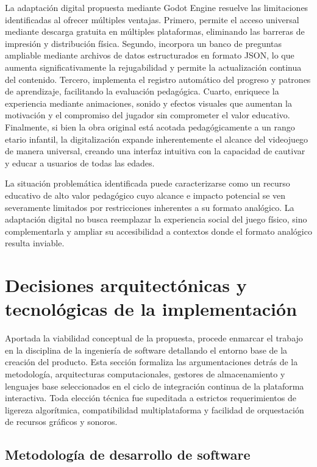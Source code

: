 La adaptación digital propuesta mediante Godot Engine resuelve las limitaciones identificadas al ofrecer múltiples ventajas. Primero, permite el acceso universal mediante descarga gratuita en múltiples plataformas, eliminando las barreras de impresión y distribución física. Segundo, incorpora un banco de preguntas ampliable mediante archivos de datos estructurados en formato JSON, lo que aumenta significativamente la rejugabilidad y permite la actualización continua del contenido. Tercero, implementa el registro automático del progreso y patrones de aprendizaje, facilitando la evaluación pedagógica. Cuarto, enriquece la experiencia mediante animaciones, sonido y efectos visuales que aumentan la motivación y el compromiso del jugador sin comprometer el valor educativo. Finalmente, si bien la obra original está acotada pedagógicamente a un rango etario infantil, la digitalización expande inherentemente el alcance del videojuego de manera universal, creando una interfaz intuitiva con la capacidad de cautivar y educar a usuarios de todas las edades.

La situación problemática identificada puede caracterizarse como un recurso educativo de alto valor pedagógico cuyo alcance e impacto potencial se ven severamente limitados por restricciones inherentes a su formato analógico. La adaptación digital no busca reemplazar la experiencia social del juego físico, sino complementarla y ampliar su accesibilidad a contextos donde el formato analógico resulta inviable.

\section{Decisiones arquitectónicas y tecnológicas de la implementación}
\label{sec:tecnologias}

Aportada la viabilidad conceptual de la propuesta, procede enmarcar el trabajo en la disciplina de la ingeniería de software detallando el entorno base de la creación del producto. Esta sección formaliza las argumentaciones detrás de la metodología, arquitecturas computacionales, gestores de almacenamiento y lenguajes base seleccionados en el ciclo de integración continua de la plataforma interactiva. Toda elección técnica fue supeditada a estrictos requerimientos de ligereza algorítmica, compatibilidad multiplataforma y facilidad de orquestación de recursos gráficos y sonoros.

\subsection{Metodología de desarrollo de software}
\label{subsec:metodologia_xp}

